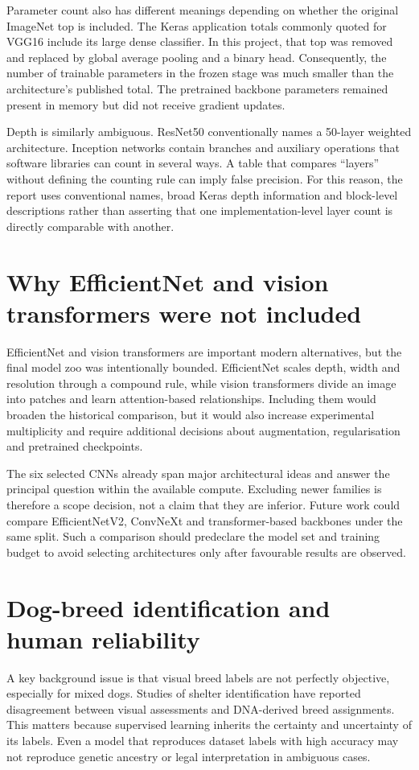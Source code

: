 Parameter count also has different meanings depending on whether the original ImageNet top is included. The Keras application totals commonly quoted for VGG16 include its large dense classifier. In this project, that top was removed and replaced by global average pooling and a binary head. Consequently, the number of trainable parameters in the frozen stage was much smaller than the architecture's published total. The pretrained backbone parameters remained present in memory but did not receive gradient updates.

Depth is similarly ambiguous. ResNet50 conventionally names a 50-layer weighted architecture. Inception networks contain branches and auxiliary operations that software libraries can count in several ways. A table that compares ``layers'' without defining the counting rule can imply false precision. For this reason, the report uses conventional names, broad Keras depth information and block-level descriptions rather than asserting that one implementation-level layer count is directly comparable with another.

\section{Why EfficientNet and vision transformers were not included}
EfficientNet and vision transformers are important modern alternatives, but the final model zoo was intentionally bounded. EfficientNet scales depth, width and resolution through a compound rule, while vision transformers divide an image into patches and learn attention-based relationships. Including them would broaden the historical comparison, but it would also increase experimental multiplicity and require additional decisions about augmentation, regularisation and pretrained checkpoints.

The six selected CNNs already span major architectural ideas and answer the principal question within the available compute. Excluding newer families is therefore a scope decision, not a claim that they are inferior. Future work could compare EfficientNetV2, ConvNeXt and transformer-based backbones under the same split. Such a comparison should predeclare the model set and training budget to avoid selecting architectures only after favourable results are observed.

\section{Dog-breed identification and human reliability}
A key background issue is that visual breed labels are not perfectly objective, especially for mixed dogs. Studies of shelter identification have reported disagreement between visual assessments and DNA-derived breed assignments. This matters because supervised learning inherits the certainty and uncertainty of its labels. Even a model that reproduces dataset labels with high accuracy may not reproduce genetic ancestry or legal interpretation in ambiguous cases.

